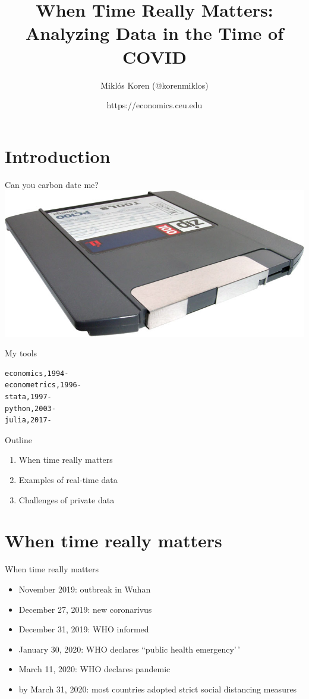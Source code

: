 \documentclass[
  ignorenonframetext,
  aspectratio=54,
]{beamer}
\title{When Time Really Matters: Analyzing Data in the Time of COVID}
\author{Miklós Koren (@korenmiklos)}
\date{https://economics.ceu.edu}
\providecommand{\tightlist}{%
  \setlength{\itemsep}{0pt}\setlength{\parskip}{0pt}}
\begin{document}
\frame{\titlepage}

\hypertarget{introduction}{%
\section{Introduction}\label{introduction}}

\begin{frame}{Can you carbon date me?}
\protect\hypertarget{can-you-carbon-date-me}{}
\includegraphics{exhibit/zipdrive.jpg}
\end{frame}

\begin{frame}[fragile]{My tools}
\protect\hypertarget{my-tools}{}
\begin{verbatim}
economics,1994-
econometrics,1996-
stata,1997-
python,2003-
julia,2017-
\end{verbatim}
\end{frame}

\begin{frame}{Outline}
\protect\hypertarget{outline}{}
\begin{enumerate}
\tightlist
\item
  When time really matters
\item
  Examples of real-time data
\item
  Challenges of private data
\end{enumerate}
\end{frame}

\hypertarget{when-time-really-matters}{%
\section{When time really matters}\label{when-time-really-matters}}

\begin{frame}{When time really matters}
\protect\hypertarget{when-time-really-matters-1}{}
\begin{itemize}
\tightlist
\item
  November 2019: outbreak in Wuhan
\item
  December 27, 2019: new coronarivus
\item
  December 31, 2019: WHO informed
\item
  January 30, 2020: WHO declares ``public health emergency'\,'
\item
  March 11, 2020: WHO declares pandemic
\item
  by March 31, 2020: most countries adopted strict social distancing
  measures
\end{itemize}
\end{frame}
\end{document}
